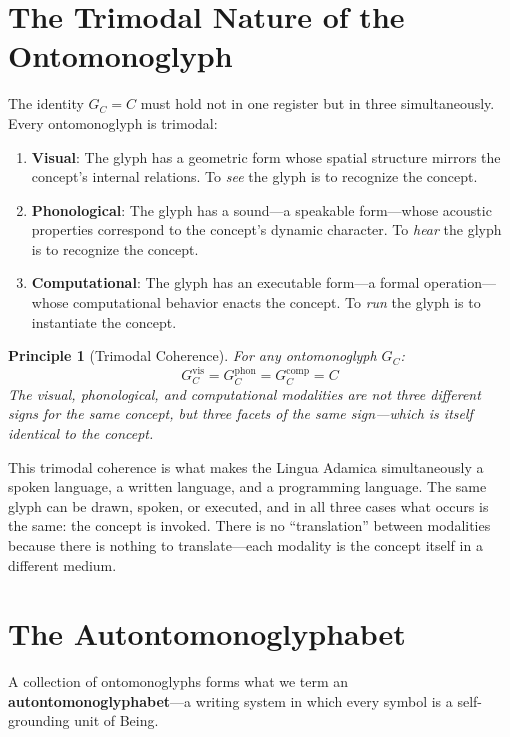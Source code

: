 \documentclass[12pt, letterpaper]{book}
\def\equiv{=}%
\newtheorem{principle}{Principle}[chapter]
\begin{document}
\section{The Trimodal Nature of the Ontomonoglyph}

The identity $G_C \equiv C$ must hold not in one register but in three simultaneously. Every ontomonoglyph is trimodal:

\begin{enumerate}[label=(\roman*)]
    \item \textbf{Visual}: The glyph has a geometric form whose spatial structure mirrors the concept's internal relations. To \textit{see} the glyph is to recognize the concept.
    \item \textbf{Phonological}: The glyph has a sound---a speakable form---whose acoustic properties correspond to the concept's dynamic character. To \textit{hear} the glyph is to recognize the concept.
    \item \textbf{Computational}: The glyph has an executable form---a formal operation---whose computational behavior enacts the concept. To \textit{run} the glyph is to instantiate the concept.
\end{enumerate}

\begin{principle}[Trimodal Coherence]\label{pr:trimodal}
For any ontomonoglyph $G_C$:
\[
G_C^{\mathrm{vis}} \equiv G_C^{\mathrm{phon}} \equiv G_C^{\mathrm{comp}} \equiv C
\]
The visual, phonological, and computational modalities are not three different signs for the same concept, but three \textit{facets} of the same sign---which is itself identical to the concept.
\end{principle}

This trimodal coherence is what makes the Lingua Adamica simultaneously a spoken language, a written language, and a programming language. The same glyph can be drawn, spoken, or executed, and in all three cases what occurs is the same: the concept is invoked. There is no ``translation'' between modalities because there is nothing to translate---each modality is the concept itself in a different medium.

\section{The Autontomonoglyphabet}

A collection of ontomonoglyphs forms what we term an \textbf{autontomonoglyphabet}---a writing system in which every symbol is a self-grounding unit of Being.
\end{document}
